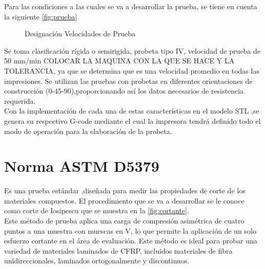 Para las condiciones a las cuales se va a desarrollar la prueba, se tiene en cuenta la siguiente \autoref{fig:prueba}


\begin{figure}[H]
    \centering
    \caption{Designación Velocidades de Prueba \citep{laureto}}
    \label{fig:prueba}
\end{figure}

Se toma clasificación rígida o semirigida, probeta tipo IV, velocidad de prueba de 50 mm/min  COLOCAR LA MAQUINA CON LA QUE SE HACE Y LA TOLERANCIA, ya que se determina que es una velocidad promedio en todas las impresiones. Se utilizan las pruebas con probetas en diferentes orientaciones de construcción (0-45-90),proporcionando así los datos necesarios de resistencia requerida.\\

Con la implementación de cada una de estas características en el modelo STL ,se genera su respectivo G-code mediante el cual la impresora tendrá definido todo el modo de operación para la elaboración de la probeta.\\


\section{Norma ASTM D5379} \label{cortante}

Es una prueba estándar ,diseñada para medir las propiedades de corte de los materiales compuestos. El  procedimiento que se va a desarrollar se le conoce como corte de Iosipescu que se muestra en la \autoref{fig:cortante}.\\

Este método de prueba aplica una carga de compresión asimétrica de cuatro puntos a una muestra con muescas en V, lo que permite la aplicación de un solo esfuerzo cortante en el área de evaluación. Este método es ideal para probar una variedad de materiales laminados de CFRP, incluidos materiales de fibra unidireccionales, laminados ortogonalmente y discontinuos.\\

